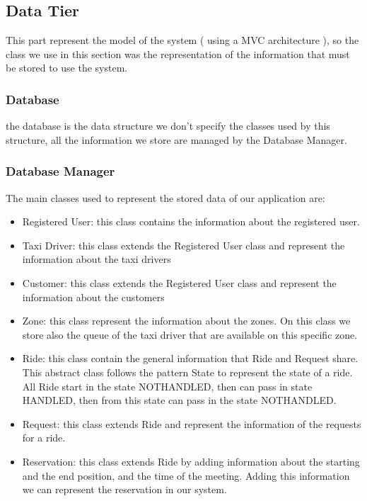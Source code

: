 \documentclass[../../../../../../dd.tex]{subfiles}
\begin{document}
	\subsection{Data Tier}
	This part represent the model of the system ( using a MVC architecture ), so the class we use in this section was the representation of the information that must be stored to use the system.
	\subsubsection{Database} the database is the data structure we don't specify the classes used by this structure, all the information we store are managed by the Database Manager.
	\subsubsection{Database Manager}
	The main classes used to represent the stored data of our application are:
	\begin{itemize}
	\item{Registered User}: this class contains the information about the registered user.
	\item{Taxi Driver}: this class extends the Registered User class and represent the information about the taxi drivers 
	\item{Customer}: this class extends the Registered User class and represent the information about the customers
	\item{Zone}: this class represent the information about the zones. On this class we store also the queue of the taxi driver that are available on this specific zone.
	\item{Ride}: this class contain the general information that Ride and Request share. This abstract class follows the pattern State to represent the state of a ride. All Ride start in the state NOT\textunderscore HANDLED, then can pass in state HANDLED, then from this state can pass in the state NOT\textunderscore HANDLED.
	\item{Request}: this class extends Ride and represent the information of the requests for a ride.
	\item{Reservation}: this class extends Ride by adding information about the starting and the end position, and the time of the meeting. Adding this information we can represent the reservation in our system.
	
	\end{itemize}
	
\end{document}
